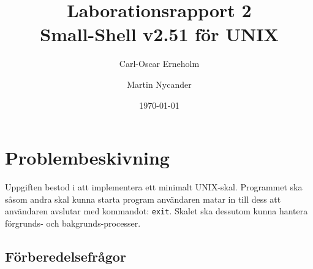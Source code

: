 \documentclass[a4paper,10pt,titlepage]{article}
\title{Laborationsrapport 2 \\ Small-Shell v2.51 för UNIX}
\author{Carl-Oscar Erneholm \and Martin Nycander}
\date{\today}
\begin{document}


\maketitle

\tableofcontents
\thispagestyle{empty}
\newpage
\setcounter{page}{1}
\section{Problembeskivning}

Uppgiften bestod i att implementera ett minimalt UNIX-skal. Programmet ska såsom
andra skal kunna starta program användaren matar in till dess att användaren
avslutar med kommandot: \verb!exit!. Skalet ska dessutom kunna hantera
förgrunds- och bakgrunds-processer.


\subsection{Förberedelsefrågor}
\end{document}
